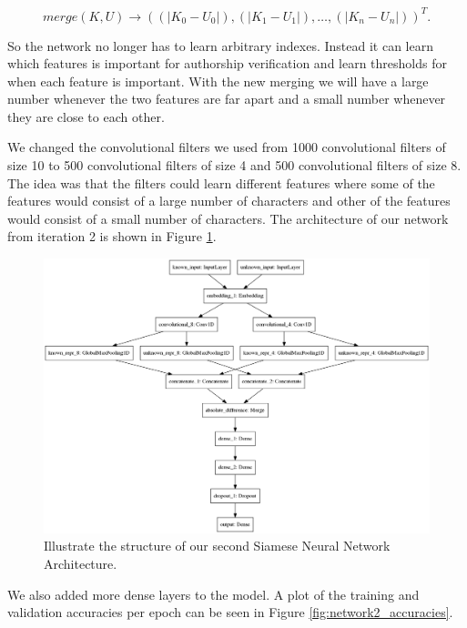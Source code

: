 \begin{equation}
    merge(K, U) \rightarrow \left(
        (|K_0 - U_0|), (|K_1 - U_1|), \dots, (|K_n - U_n|)
    \right)^T.
\end{equation}

So the network no longer has to learn arbitrary indexes. Instead it can learn
which features is important for authorship verification and learn thresholds for
when each feature is important. With the new merging we will have a large number
whenever the two features are far apart and a small number whenever they are
close to each other.

We changed the convolutional filters we used from 1000 convolutional filters of
size 10 to 500 convolutional filters of size 4 and 500 convolutional filters of
size 8. The idea was that the filters could learn different features where some
of the features would consist of a large number of characters and other of the
features would consist of a small number of characters. The architecture of our
network from iteration 2 is shown in Figure \ref{fig:network_2}.

\begin{figure}
    \centering
    \includegraphics[width=\textwidth]{./pictures/method/network2.png}
    \caption{Illustrate the structure of our second Siamese Neural Network
        Architecture.}
    \label{fig:network_2}
\end{figure}

We also added more dense layers to the model. A plot of the
training and validation accuracies per epoch can be seen in Figure
\ref{fig:network2_accuracies}.

